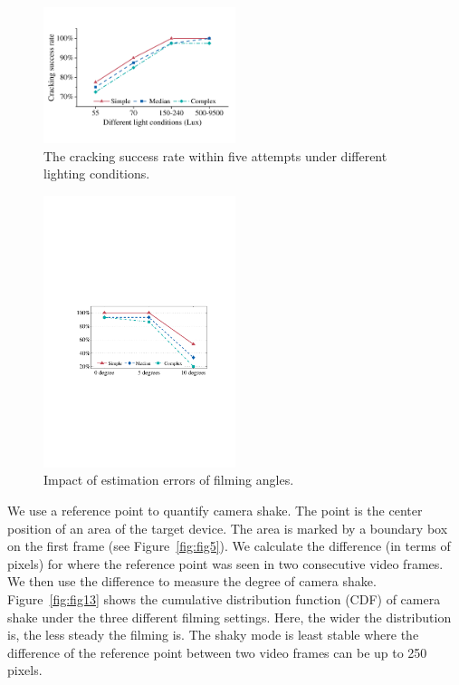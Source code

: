        \begin{figure}[t!]
            \centering
            \includegraphics[width=0.5\textwidth]{fig/light.pdf}
            \caption{The cracking success rate within five attempts under different lighting conditions.}
            \label{fig:light}
        \end{figure}

        \begin{figure}[!t]
        \centering
        \includegraphics[width=0.5\textwidth]{fig/15.pdf}
        \caption{Impact of estimation errors of filming angles.}
        \label{fig:fig15}
    \end{figure}

    We use a reference point to quantify camera shake. The point
    is the center position of an area of the target device. The area is marked by a boundary box on the first
    frame (see Figure~\ref{fig:fig5}). We calculate the difference (in terms of pixels) for where the
    reference point was seen in two consecutive video frames. We then use the difference to measure the degree of camera shake.
    Figure~\ref{fig:fig13} shows the cumulative distribution function (CDF)
    of camera shake under the three different filming settings.
    Here, the wider the distribution is, the less steady the
     filming is. The shaky mode is least stable where the difference of the reference point between two video frames can be up to 250 pixels.


